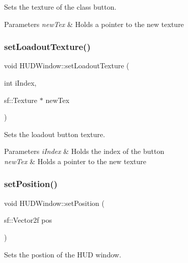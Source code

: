 Sets the texture of the class button. 


\begin{DoxyParams}{Parameters}
{\em new\+Tex} & Holds a pointer to the new texture \\
\hline
\end{DoxyParams}
\mbox{\label{class_h_u_d_window_ab89d2157a02b7092134cb2b58659c84f}} 
\subsubsection{\texorpdfstring{set\+Loadout\+Texture()}{setLoadoutTexture()}}
{\footnotesize\ttfamily void H\+U\+D\+Window\+::set\+Loadout\+Texture (\begin{DoxyParamCaption}\item[{int}]{i\+Index,  }\item[{sf\+::\+Texture $\ast$}]{new\+Tex }\end{DoxyParamCaption})}



Sets the loadout button texture. 


\begin{DoxyParams}{Parameters}
{\em i\+Index} & Holds the index of the button \\
\hline
{\em new\+Tex} & Holds a pointer to the new texture \\
\hline
\end{DoxyParams}
\mbox{\label{class_h_u_d_window_a3b77bee82174e05560ccb90d3b55135f}} 
\subsubsection{\texorpdfstring{set\+Position()}{setPosition()}}
{\footnotesize\ttfamily void H\+U\+D\+Window\+::set\+Position (\begin{DoxyParamCaption}\item[{sf\+::\+Vector2f}]{pos }\end{DoxyParamCaption})}



Sets the postion of the H\+UD window. 


